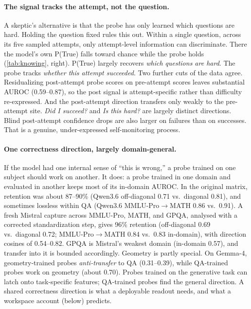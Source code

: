 \documentclass{article}
\begin{document}
\paragraph{The signal tracks the attempt, not the question.}
A skeptic's alternative is that the probe has only learned which questions are hard.
Holding the question fixed rules this out.
Within a single question, across its five sampled attempts, only attempt-level information can discriminate.
There the model's own P(True) falls toward chance while the probe holds (\cref{tab:knowing}, right).
P(True) largely recovers \emph{which questions are hard}.
The probe tracks \emph{whether this attempt succeeded}.
Two further cuts of the data agree.
Residualizing post-attempt probe scores on pre-attempt scores leaves substantial AUROC (0.59--0.87), so the post signal is attempt-specific rather than difficulty re-expressed.
And the post-attempt direction transfers only weakly to the pre-attempt site.
\emph{Did I succeed?} and \emph{Is this hard?} are largely distinct directions.
Blind post-attempt confidence drops are also larger on failures than on successes.
That is a genuine, under-expressed self-monitoring process.

\paragraph{One correctness direction, largely domain-general.}
If the model had one internal sense of ``this is wrong,'' a probe trained on one subject should work on another.
It does: a probe trained in one domain and evaluated in another keeps most of its in-domain AUROC.
In the original matrix, retention was about 87--90\% (Qwen3.6 off-diagonal 0.71 vs.\ diagonal 0.81), and sometimes lossless within QA (Qwen3.6 MMLU-Pro$\to$MATH 0.86 vs.\ 0.91).
A fresh Mistral capture across MMLU-Pro, MATH, and GPQA, analysed with a corrected standardization step, gives 96\% retention (off-diagonal 0.69 vs.\ diagonal 0.72; MMLU-Pro$\to$MATH 0.84 vs.\ 0.83 in-domain), with direction cosines of 0.54--0.82.
GPQA is Mistral's weakest domain (in-domain 0.57), and transfer into it is bounded accordingly.
Geometry is partly special.
On Gemma-4, geometry-trained probes \emph{anti-transfer} to QA (0.31--0.39), while QA-trained probes work on geometry (about 0.70).
Probes trained on the generative task can latch onto task-specific features; QA-trained probes find the general direction.
A shared correctness direction is what a deployable readout needs, and what a workspace account (below) predicts.
\end{document}

